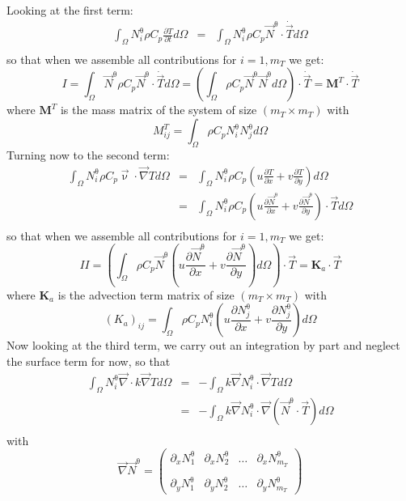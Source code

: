 Looking at the first term:
\begin{eqnarray}
\int_\Omega N^\uptheta_i  \rho C_p \frac{\partial T}{\partial t} d\Omega
&=&  \int_\Omega N^\uptheta_i  \rho C_p \vec N^\uptheta \cdot \dot{\vec T}  d\Omega \\
\end{eqnarray}
so that when we assemble all contributions for $i=1,m_T$ we get:
\[
I 
= \int_\Omega \vec N^\uptheta  \rho C_p \vec N^\uptheta \cdot \dot{\vec T}  d\Omega
= \left( \int_\Omega \rho C_p  \vec N^\uptheta  \vec N^\uptheta  d\Omega \right) \cdot \dot{\vec T}
= {\bm M}^T \cdot \dot{\vec T}
 \]
where ${\bm M}^T$ is the mass matrix of the system of size $(m_T \times m_T)$ with 
\[
M_{ij}^T = \int_\Omega \rho C_p N_i^\uptheta N_j^\uptheta d\Omega
\]
Turning now to the second term:
\begin{eqnarray}
\int_\Omega N^\uptheta_i  \rho C_p  {\vec \upnu}\cdot {\vec\nabla T}   d\Omega
&=& \int_\Omega N^\uptheta_i  \rho C_p (u \frac{\partial T}{\partial x} +  v \frac{\partial T}{\partial y} ) d\Omega \\
&=& \int_\Omega N^\uptheta_i  \rho C_p (u \frac{\partial \vec N^\uptheta}{\partial x} +  v \frac{\partial \vec N^\uptheta}{\partial y} ) \cdot \vec T d\Omega \\
\end{eqnarray}
so that when we assemble all contributions for $i=1,m_T$ we get:
\[
II = \left(\int_\Omega \rho C_p \vec N^\uptheta (u \frac{\partial \vec N^\uptheta}{\partial x} +  v \frac{\partial \vec N^\uptheta}{\partial y} ) d\Omega \right)  \cdot \vec T = {\bm K}_a \cdot \vec T
\]
where ${\bm K}_a$ is the advection term matrix of size $(m_T \times m_T)$ with
\[
(K_a)_{ij} = \int_\Omega \rho C_p N_i^\uptheta 
\left(u \frac{\partial N_j^\uptheta}{\partial x} +  v \frac{\partial N_j^\uptheta}{\partial y} \right) d\Omega 
\]
Now looking at the third term, we carry out an integration by part and neglect the surface term for now, so that 
\begin{eqnarray}
\int_\Omega  N^\uptheta_i {\vec \nabla} \cdot k \vec\nabla T d\Omega
&=& - \int_\Omega  k \vec \nabla N^\uptheta_i \cdot \vec\nabla T d\Omega \\
&=& - \int_\Omega  k \vec \nabla N^\uptheta_i \cdot \vec\nabla (\vec N^\uptheta \cdot \vec T) d\Omega \\
\end{eqnarray}
with 
\[
\vec \nabla \vec N^\uptheta = 
\left(
\begin{array}{cccc}
\partial_x N_1^\uptheta & 
\partial_x N_2^\uptheta & \dots &
\partial_x N_{m_T}^\uptheta \\ \\
\partial_y N_1^\uptheta & 
\partial_y N_2^\uptheta & \dots &
\partial_y N_{m_T}^\uptheta 
\end{array}
\right)
\]
